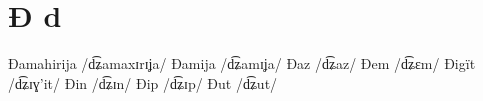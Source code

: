 \chapter{Đ d}

Đamahirija /d͡ʑamaxɪrɪʝa/
Đamija /d͡ʑamɪʝa/
Đaz /d͡ʑaz/
Đem /d͡ʑɛm/
Đigït /d͡ʑɪɣ’it/
Đin /d͡ʑɪn/
Đip /d͡ʑɪp/
Đut /d͡ʑut/